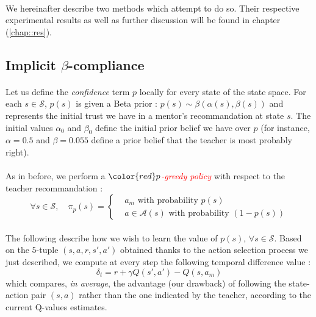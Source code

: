 \documentclass[a4paper]{report}
\begin{document}
{{{		\paragraph{}We hereinafter describe two methods which attempt to do so. Their respective experimental results as well as further discussion will be found in chapter (\ref{chap::res}).  
		
		\subsection{Implicit $\beta$-compliance}
		{
			\paragraph{}  Let us define the \emph{confidence} term $p$ locally for every state of the state space. For each $s\in\mathcal{S}$, $p(s)$ is given a Beta prior : $p(s)\sim \beta(\alpha(s),\beta(s))$ and represents the initial trust we have in a mentor's recommandation at state $s$. The initial values $\alpha_0$ and $\beta_0$ define the initial prior belief we have over $p$ (for instance, $\alpha=0.5$ and $\beta = 0.055$ define a prior belief that the teacher is most probably right). 
			
			\paragraph{} As in before, we perform a $\color{red}p$\textcolor{red}{\emph{-greedy policy}} with respect to the teacher recommandation : 
			\begin{equation}
				\forall s\in\mathcal{S}, \quad \pi_p(s) = 
					\left\{ 
					\begin{aligned}
						&a_m \text{ with probability } p(s) \\
						& a\in\mathcal{A}(s) \text{ with probability } (1-p(s))
					\end{aligned}
					\right. 
			\end{equation}
		
			\paragraph{} The following describe how we wish to learn the value of $p(s)$, $\forall s\in\mathcal{S}$. Based on the $5$-tuple $(s,a,r,s',a')$ obtained thanks to the action selection process we just described, we compute at every step the following temporal difference value : 
			\begin{equation}
				\delta_t = r + \gamma Q(s',a') - Q(s,a_m)
			\end{equation}
			which compares, \emph{in average}, the advantage (our drawback) of following the state-action pair $(s,a)$ rather than the one indicated by the teacher, according to the current Q-values estimates. 
		
}}}}
\end{document}
